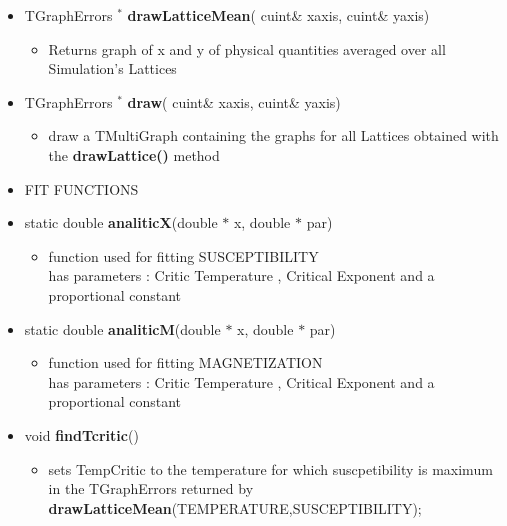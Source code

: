 \begin{itemize}
\begin{itemize}
\begin{itemize}
    \end{itemize}


  \item[] TGraphErrors ${}^*$ \textbf{drawLatticeMean}(
    cuint\& x\textunderscore axis,
    cuint\& y\textunderscore axis)
    \begin{itemize}
    \item[] Returns graph of x and y of physical quantities averaged over all Simulation's Lattices
    \end{itemize}

  \item[] TGraphErrors ${}^*$ \textbf{draw}(
    cuint\& x\textunderscore axis,
    cuint\& y\textunderscore axis)
    \begin{itemize}
    \item[] draw a TMultiGraph containing the graphs for all Lattices obtained with the \textbf{drawLattice()} method 
    \end{itemize}

  \item[] FIT FUNCTIONS \\

  \item[] static double \textbf{analiticX}(double $*$ x, double $*$ par)
    \begin{itemize}
    \item[] function used for fitting SUSCEPTIBILITY \\
    		has parameters : Critic Temperature , Critical Exponent and a proportional constant
    \end{itemize}

  \item[] static double \textbf{analiticM}(double $*$ x, double $*$ par)
    \begin{itemize}
    \item[] function used for fitting MAGNETIZATION \\
    		has parameters : Critic Temperature , Critical Exponent and a proportional constant
    \end{itemize}

  \item[] void \textbf{findTcritic}()
    \begin{itemize}
    \item[] sets TempCritic to the temperature for which suscpetibility is maximum in the TGraphErrors returned by \textbf{drawLatticeMean}(TEMPERATURE,SUSCEPTIBILITY);
    \end{itemize}


\end{itemize}
\end{itemize}
